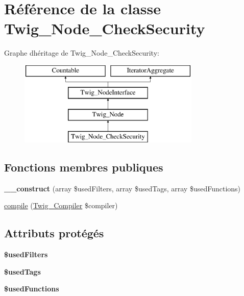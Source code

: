 \hypertarget{class_twig___node___check_security}{}\section{Référence de la classe Twig\+\_\+\+Node\+\_\+\+Check\+Security}
\label{class_twig___node___check_security}
Graphe d\textquotesingle{}héritage de Twig\+\_\+\+Node\+\_\+\+Check\+Security\+:\begin{figure}[H]
\begin{center}
\leavevmode
\includegraphics[height=4.000000cm]{class_twig___node___check_security}
\end{center}
\end{figure}
\subsection*{Fonctions membres publiques}
\begin{DoxyCompactItemize}
\item 
{\bfseries \+\_\+\+\_\+construct} (array \$used\+Filters, array \$used\+Tags, array \$used\+Functions)\hypertarget{class_twig___node___check_security_ad11370c842a86bba892093faf07df875}{}\label{class_twig___node___check_security_ad11370c842a86bba892093faf07df875}

\item 
\hyperlink{class_twig___node___check_security_a4e0faa87c3fae583620b84d3607085da}{compile} (\hyperlink{class_twig___compiler}{Twig\+\_\+\+Compiler} \$compiler)
\end{DoxyCompactItemize}
\subsection*{Attributs protégés}
\begin{DoxyCompactItemize}
\item 
{\bfseries \$used\+Filters}\hypertarget{class_twig___node___check_security_af9391002e3a74e97829228fb39c0f96c}{}\label{class_twig___node___check_security_af9391002e3a74e97829228fb39c0f96c}

\item 
{\bfseries \$used\+Tags}\hypertarget{class_twig___node___check_security_acfbba4351fbef8b69fbd3fde60d997ad}{}\label{class_twig___node___check_security_acfbba4351fbef8b69fbd3fde60d997ad}

\item 
{\bfseries \$used\+Functions}\hypertarget{class_twig___node___check_security_a840097a1863a38a4de51e2b82ef6b32f}{}\label{class_twig___node___check_security_a840097a1863a38a4de51e2b82ef6b32f}

\end{DoxyCompactItemize}


